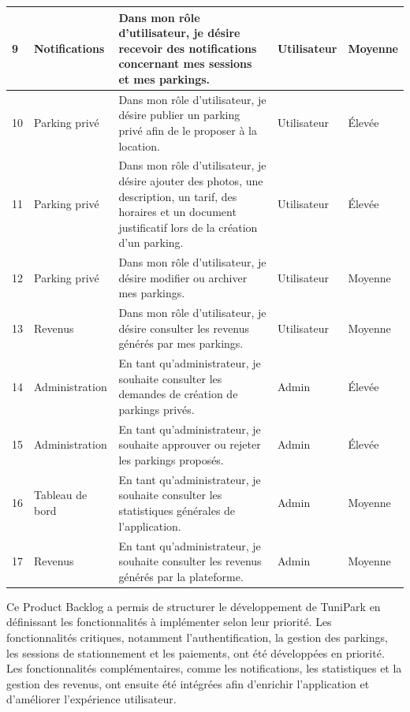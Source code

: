 \begin{longtable}{|p{}|p{}|p{}|p{}|p{}|}
9 & Notifications & Dans mon rôle d'utilisateur, je désire recevoir des notifications concernant mes sessions et mes parkings. & Utilisateur & Moyenne \\
\hline

10 & Parking privé & Dans mon rôle d'utilisateur, je désire publier un parking privé afin de le proposer à la location. & Utilisateur & Élevée \\
\hline

11 & Parking privé & Dans mon rôle d'utilisateur, je désire ajouter des photos, une description, un tarif, des horaires et un document justificatif lors de la création d'un parking. & Utilisateur & Élevée \\
\hline

12 & Parking privé & Dans mon rôle d'utilisateur, je désire modifier ou archiver mes parkings. & Utilisateur & Moyenne \\
\hline

13 & Revenus & Dans mon rôle d'utilisateur, je désire consulter les revenus générés par mes parkings. & Utilisateur & Moyenne \\
\hline

14 & Administration & En tant qu'administrateur, je souhaite consulter les demandes de création de parkings privés. & Admin & Élevée \\
\hline

15 & Administration & En tant qu'administrateur, je souhaite approuver ou rejeter les parkings proposés. & Admin & Élevée \\
\hline

16 & Tableau de bord & En tant qu'administrateur, je souhaite consulter les statistiques générales de l'application. & Admin & Moyenne \\
\hline

17 & Revenus & En tant qu'administrateur, je souhaite consulter les revenus générés par la plateforme. & Admin & Moyenne \\
\hline

\end{longtable}

\normalsize

\par Ce Product Backlog a permis de structurer le développement de TuniPark en définissant les fonctionnalités à implémenter selon leur priorité. Les fonctionnalités critiques, notamment l'authentification, la gestion des parkings, les sessions de stationnement et les paiements, ont été développées en priorité. Les fonctionnalités complémentaires, comme les notifications, les statistiques et la gestion des revenus, ont ensuite été intégrées afin d'enrichir l'application et d'améliorer l'expérience utilisateur.

